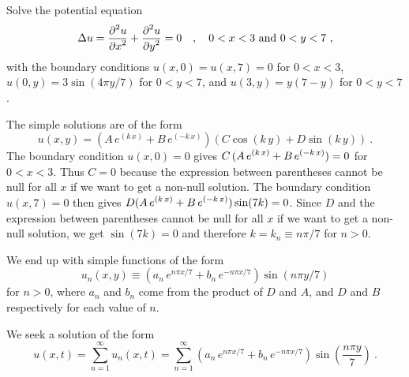 \begin{egg}
Solve the potential equation
\[
\Delta u = \frac{\displaystyle \partial^{2}{u}} {\displaystyle \partial x^{2}} + \frac{\displaystyle \partial^{2}{u}} {\displaystyle \partial y^{2}} = 0 \quad ,
\quad 0<x<3 \ \text{and} \ 0<y<7 \ ,
\]
with the boundary conditions
$u(x,0) = u(x,7) = 0$ for $0<x<3$, $u(0,y) = 3\sin\left(4\pi y/7\right)$
for $0<y<7$, and $u(3,y) = y(7-y)$ for $0<y<7$.

The simple solutions are of the form
\[
u(x,y) = (A\,e^{(k\,x)} + B\,e^{(-k\,x)})(C \cos(k\,y) + D \sin(k\,y)) \ .
\]
The boundary condition $u(x,0) =0$ gives
$\displaystyle C\,(A\,e^{(k\,x)} + B\,e^{(-k\,x)})=0$ for $0<x<3$.
Thus $C=0$ because the expression between parentheses cannot be null
for all $x$ if we want to get a non-null solution.  The boundary
condition $u(x,7) = 0$ then gives
$\displaystyle D (A\,e^{(k\,x)} + B\,e^{(-k\,x)})\sin(7k) = 0$.  Since $D$ and
the expression between parentheses cannot be null for all $x$ if we
want to get a non-null solution, we get $\sin(7k) = 0$ and therefore
$k=k_n \equiv n\pi/7$ for $n >0$.

We end up with simple functions of the form
\[
u_n(x,y) \equiv \left(a_n\,e^{n\pi x/7} + b_n\,e^{-n\pi x/7}\right)\sin(n\pi y/7)
\]
for $n > 0$, where $a_n$ and $b_n$ come from the product of $D$ and
$A$, and $D$ and $B$ respectively for each value of $n$.

We seek a solution of the form
\[
u(x,t) = \sum_{n=1}^\infty u_n(x,t)
= \sum_{n=1}^\infty \left(a_n\,e^{n\pi x/7}
+ b_n\,e^{-n\pi x/7}\right)\sin\left(\frac{n\pi y}{7}\right) \ .
\]


\end{egg}
